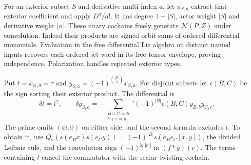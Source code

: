 For an exterior subset $S$ and derivative
multi-index $a$, let $x_{S,a}$ extract that
exterior coefficient and apply $D^a/a!$.
It has degree $1-|S|$, actor weight $|S|$
and derivative weight $|a|$.
These unary cochains freely generate
$\mathcal N(P;Z)$ under convolution.
Indeed their products are signed orbit
sums of ordered differential monomials.
Evaluation in the free differential Lie
algebra on distinct named inputs recovers
each ordered jet word in its free tensor
envelope, proving independence.
Polarization handles repeated exterior types.

Put $t=x_{\varnothing,0}=\tau$ and
$y_{S,a}=(-1)^{\binom{|S|}{2}}x_{S,a}$.
For disjoint subsets let $\epsilon(B,C)$
be the sign sorting their exterior product.
The differential is
\begin{equation}\label{cbc:va:natural-differential}
 \delta t=t^2,\qquad
 \delta y_{S,a}
 =-\sum_{\substack{B\sqcup C=S\\b+c=a}}'
    (-1)^{|B|}\epsilon(B,C)y_{B,b}y_{C,c}.
\end{equation}
The prime omits $(\varnothing,0)$ on either
side, and the second formula excludes $t$.
To obtain it, use
$Q_2(s(e_Bx)s(e_Cy))=(-1)^{|B|}
s(e_Be_C[x,y])$, the divided Leibniz rule,
and the convolution sign
$(-1)^{|g||c'|}$ in $(f*g)(c)$.
The terms containing $t$ cancel the
commutator with the scalar twisting cochain.


